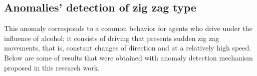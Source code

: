 
\subsection{Anomalies' detection of zig zag type}

This anomaly corresponds to a common behavior for agents who drive under the influence of alcohol; it consists of driving that presents sudden zig zag movements, that is, constant changes of direction and at a relatively high speed. Below are some of results that were obtained with anomaly detection mechanism proposed in this research work.

